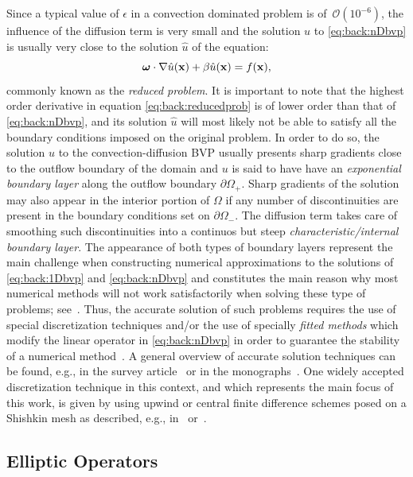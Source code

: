 Since a typical value of $\epsilon$ in a convection dominated problem is
of~$\mathscr{O}(10^{-6})$, the influence of the diffusion term is very small and the solution $u$ to \eqref{eq:back:nDbvp} is usually very close to the solution $\hat{u}$ of the equation:
%
\begin{equation}\label{eq:back:reducedprob}
\bm{\omega} \cdot \nabla \hat{u}(\mathbf{x})+\beta \hat{u}(\mathbf{x}) = f(\mathbf{x}),
\end{equation}
%
commonly known as the \emph{reduced problem}. It is important to note that the highest order derivative in equation \eqref{eq:back:reducedprob} is of lower order than that of \eqref{eq:back:nDbvp}, and its solution $\hat{u}$ will most likely not be able to satisfy all the boundary conditions imposed on the original problem. In order to do so, the solution $u$ to the convection-diffusion BVP usually presents sharp gradients close to the outflow boundary of the domain and $u$ is said to have have an \emph{exponential boundary layer} along the outflow boundary $\partial\Omega_{+}$. Sharp gradients of the solution may also appear in the interior portion of $\Omega$ if any number of
discontinuities are present in the boundary conditions set on $\partial\Omega_{-}$. The diffusion term takes care of smoothing such discontinuities into a
continuos but steep \emph{characteristic/internal boundary layer}. The appearance of both types of boundary layers represent the main challenge when constructing numerical approximations to the solutions of \eqref{eq:back:1Dbvp} and \eqref{eq:back:nDbvp} and constitutes the main reason why
most numerical methods will not work satisfactorily when solving these type of
problems; see~\cite{Mor96}. Thus, the accurate solution of such problems requires the use of
special discretization techniques and/or the use of specially
\emph{fitted methods} which modify the linear operator in
\eqref{eq:back:nDbvp} in order to guarantee the stability of a numerical
method~\cite{Sty13}. A general overview of accurate solution techniques can be found, e.g.,
in the survey article~\cite{Sty05} or in the
monographs~\cite{Lin10, RooStyTob08}. One widely accepted discretization
technique in this context, and which represents the main focus of this work, is
given by using upwind or central finite difference schemes posed on a Shishkin
mesh as described, e.g., in~\cite[\S~5]{Sty05}
or~\cite{FarHegMilOriShi00,KopOri10,LinSty01,MilOriShi96}.

\subsection{Elliptic Operators}
\label{back:convdiff:elliptic}

